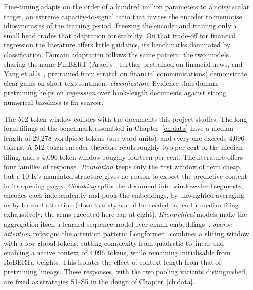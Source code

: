 Fine-tuning adapts on the order of a hundred million parameters %
to a noisy scalar target, an extreme capacity-to-signal ratio that invites the encoder to memorise idiosyncrasies of the training period. Freezing the encoder and training only a small head trades that adaptation for stability. On that trade-off for financial regression the literature offers little guidance, its benchmarks dominated by classification. Domain adaptation follows the same pattern: the two models sharing the name FinBERT (Araci's~\cite{araci2019finbert}, further pretrained on financial news, and Yang et al.'s~\cite{yang2020finbert}, pretrained from scratch on financial communications) demonstrate clear gains on short-text sentiment \emph{classification}. Evidence that domain pretraining helps on \emph{regression} over book-length documents against strong numerical baselines is far scarcer.

The 512-token window collides with the documents this project studies. The long-form filings of the benchmark assembled in Chapter~\ref{ch:data} have a median length of 29{,}278 wordpiece tokens %
(sub-word units), and every one exceeds 4{,}096 tokens. %
A 512-token encoder therefore reads roughly two per cent of the median filing, and a 4{,}096-token window roughly fourteen per cent. %
The literature offers four families of response. \emph{Truncation} keeps only the first window of text: cheap, but a 10-K's mandated structure gives no reason to expect the predictive content in its opening pages. \emph{Chunking} splits the document into window-sized segments, encodes each independently and pools the embeddings, by unweighted averaging or by learned attention (close to sixty would be needed to read a median filing exhaustively; the arms executed here cap at eight). %
\emph{Hierarchical} models make the aggregation itself a learned sequence model over chunk embeddings~\cite{pappagari2019hierarchical}. \emph{Sparse attention} redesigns the attention pattern: Longformer~\cite{beltagy2020longformer} combines a sliding window with a few global tokens, cutting complexity from quadratic to linear and enabling a native context of 4{,}096 tokens, %
while remaining initialisable from RoBERTa weights. This isolates the effect of context length from that of pretraining lineage. These responses, with the two pooling variants distinguished, are fixed as strategies S1--S5 in the design of Chapter~\ref{ch:data}.

